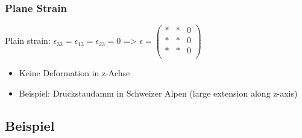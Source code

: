 \documentclass[a4paper]{scrartcl}
\begin{document}
\subsubsection{Plane Strain}
Plain strain: $\epsilon_{33} = \epsilon_{13} = \epsilon_{23}= 0$ => $\epsilon =
\begin{pmatrix}
* & * & 0\\
* & * & 0\\
* & * & 0\\
\end{pmatrix} $\\
\begin{itemize}
  \item Keine Deformation in z-Achse
  \item Beispiel: Druckstaudamm in Schweizer Alpen (large extension along
  z-axis)
\end{itemize}


\subsection{Beispiel}
\end{document}
